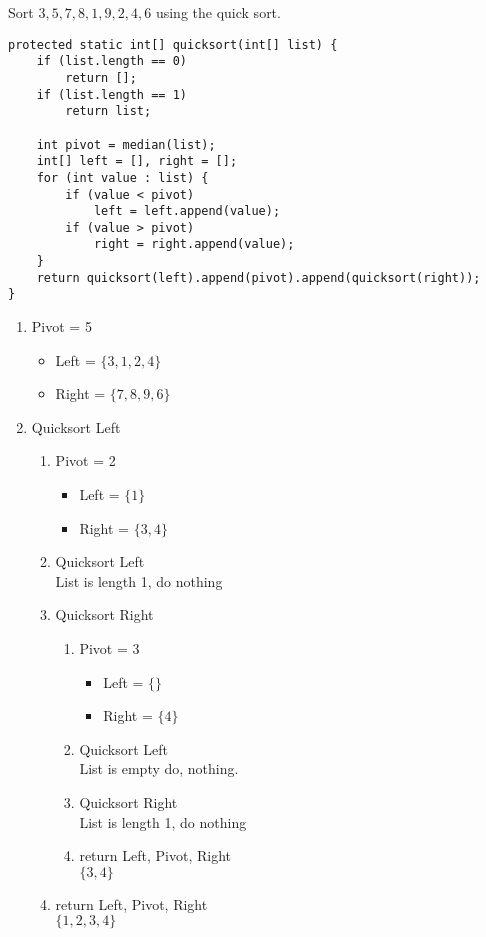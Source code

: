 \documentclass[12pt]{article}  %
\begin{document}
\noindent
Sort $3,5,7,8,1,9,2,4,6$ using the quick sort.
\begin{verbatim}
protected static int[] quicksort(int[] list) {
    if (list.length == 0)
        return [];
    if (list.length == 1)
        return list;
    
    int pivot = median(list);
    int[] left = [], right = [];
    for (int value : list) {
        if (value < pivot)
            left = left.append(value);
        if (value > pivot)
            right = right.append(value);
    }
    return quicksort(left).append(pivot).append(quicksort(right));
}
\end{verbatim}
\begin{enumerate}
    \item Pivot = 5
    \begin{itemize}
        \item Left = $\{3,1,2,4\}$
        \item Right = $\{7,8,9,6\}$
    \end{itemize}
    
    \item Quicksort Left
    \begin{enumerate}
        \item Pivot = 2
        \begin{itemize}
            \item Left = $\{1\}$
            \item Right = $\{3,4\}$
        \end{itemize}
        \item Quicksort Left\\
            List is length 1, do nothing
        \item Quicksort Right
        \begin{enumerate}
            \item Pivot = 3
            \begin{itemize}
                \item Left = $\{\}$
                \item Right = $\{4\}$
            \end{itemize}
            \item Quicksort Left\\
            List is empty do, nothing.
            \item Quicksort Right\\
            List is length 1, do nothing
            \item return Left, Pivot, Right\\
            $\{3,4\}$
        \end{enumerate}
        \item return Left, Pivot, Right\\
        $\{1,2,3,4\}$
    \end{enumerate}
    

\end{enumerate}
\end{document}
